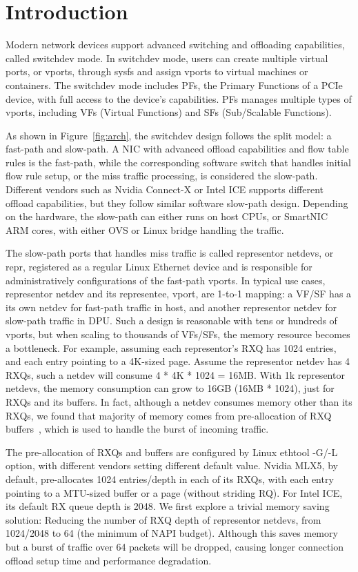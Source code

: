 \documentclass[letterpaper]{article}
\begin{document}
\section{Introduction}
Modern network devices support advanced switching and offloading
capabilities, called switchdev mode. In switchdev mode, users can
create multiple virtual ports, or vports, through sysfs and assign
vports to virtual machines or containers. The switchdev mode includes
PFs, the Primary Functions of a PCIe device, with full access to the device's
capabilities. PFs manages multiple types of vports, including
VFs (Virtual Functions) and SFs (Sub/Scalable Functions).

As shown in Figure~\ref{fig:arch}, the switchdev design follows the
split model: a fast-path and slow-path.
A NIC with advanced offload capabilities and flow table rules is
the fast-path, while the corresponding software switch that handles
initial flow rule setup, or the miss traffic processing, is considered the
slow-path. Different vendors such as Nvidia Connect-X or Intel ICE
supports different offload capabilities, but they follow similar
software slow-path design. Depending on the hardware, the slow-path can
either runs on host CPUs, or SmartNIC ARM cores, with either OVS or
Linux bridge handling the traffic.

The slow-path ports that handles miss traffic is called representor
netdevs, or repr, registered as a regular Linux Ethernet device and is responsible
for administratively configurations of the fast-path vports.
In typical use cases, representor netdev and its representee, vport,
are 1-to-1 mapping: a VF/SF has a its own netdev for fast-path traffic
in host, and another representor netdev for slow-path traffic in DPU.
Such a design is reasonable with tens or hundreds of vports, but when scaling
to thousands of VFs/SFs, the memory resource becomes a bottleneck.
For example, assuming each representor's RXQ has 1024 entries, and each entry
pointing to a 4K-sized page. Assume the representor netdev has 4 RXQs,
such a netdev will consume 4 * 4K * 1024 = 16MB.
With 1k representor netdevs, the memory consumption can grow
to 16GB (16MB * 1024), just for RXQs and its buffers.
In fact, although a netdev consumes memory other than its RXQs,
we found that majority of memory comes from pre-allocation
of RXQ buffers~\cite{jakub}, which is used to handle the burst of incoming traffic.

The pre-allocation of RXQs and buffers are configured by Linux
ethtool -G/-L option, with different vendors setting different default
value. Nvidia MLX5, by default, pre-allocates 1024 entries/depth in each of
its RXQs, with each entry pointing to a MTU-sized buffer or a page
(without striding RQ). For Intel ICE, its default RX queue depth is 2048.
We first explore a trivial memory saving solution: Reducing the number
of RXQ depth of representor netdevs, from 1024/2048 to 64 (the minimum of NAPI
budget). Although this saves memory but a burst of traffic over 64 packets
will be dropped, causing longer connection offload setup time and
performance degradation.
\end{document}
